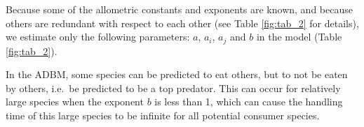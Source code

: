 \documentclass{article}
\begin{document}
Because some of the allometric constants and exponents are known, and
because others are redundant with respect to each other (see Table
\ref{fig:tab_2} for details), we estimate only the following parameters:
\(a\), \(a_i\), \(a_j\) and \(b\) in the model (Table \ref{fig:tab_2}).

\begin{table}

\caption{\label{tab:unnamed-chunk-2}\label{fig:tab_2}Traits with their allometric function and corresponding parameters in ADBM.}
\centering
{}
\end{table}

In the ADBM, some species can be predicted to eat others, but to not be
eaten by others, i.e.~be predicted to be a top predator. This can occur
for relatively large species when the exponent \(b\) is less than 1,
which can cause the handling time of this large species to be infinite
for all potential consumer species.
\end{document}
